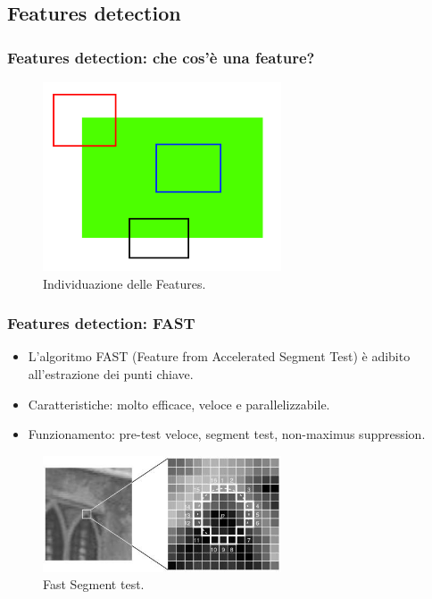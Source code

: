\documentclass{beamer}
\begin{document}
\subsection{Features detection}
\begin{frame}
\frametitle{Features detection: che cos'è una feature?}

\begin{figure}[h]
	\centering
	\includegraphics[width=200pt]{imgs/feature_simple.png}
	\caption{Individuazione delle Features.}
	\label{vis:feature:detect}
\end{figure} 
\end{frame}

\begin{frame}
\frametitle{Features detection: FAST}
\begin{itemize}
	\item L'algoritmo FAST (Feature from Accelerated Segment Test) è adibito all'estrazione dei punti chiave.
	\item Caratteristiche: molto efficace, veloce e parallelizzabile.
	\item Funzionamento: pre-test veloce, segment test, non-maximus suppression.
\end{itemize}
\begin{figure}[h]
	\centering
	\includegraphics[width=200pt]{imgs/fast_speedtest.jpg}
	\caption{Fast Segment test.}
	\label{vis:feature:Fast}
\end{figure}
\end{frame}
\end{document}

